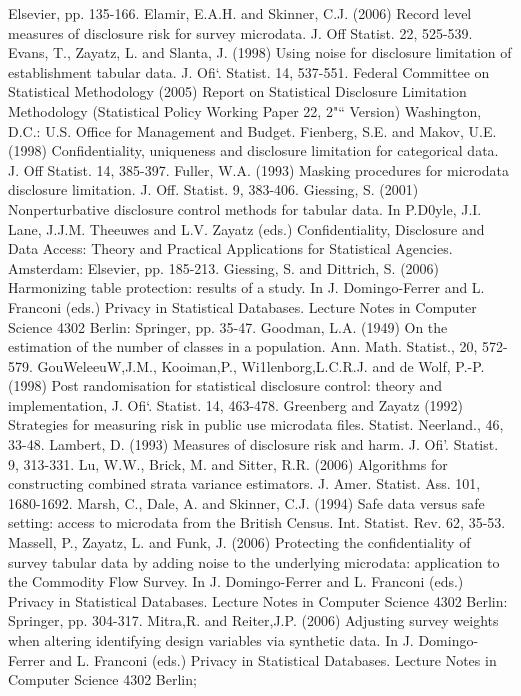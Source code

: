 Elsevier, pp. 135-166.
Elamir, E.A.H. and Skinner, C.J. (2006) Record level measures of disclosure risk for
survey microdata. J. Off Statist. 22, 525-539.
Evans, T., Zayatz, L. and Slanta, J. (1998) Using noise for disclosure limitation of
establishment tabular data. J. Oﬁ‘. Statist. 14, 537-551.
Federal Committee on Statistical Methodology (2005) Report on Statistical Disclosure
Limitation Methodology (Statistical Policy Working Paper 22, 2"“ Version)
Washington, D.C.: U.S. Office for Management and Budget.
Fienberg, S.E. and Makov, U.E. (1998) Confidentiality, uniqueness and disclosure
limitation for categorical data. J. Off Statist. 14, 385-397.
Fuller, W.A. (1993) Masking procedures for microdata disclosure limitation. J. Off.
Statist. 9, 383-406.
Giessing, S. (2001) Nonperturbative disclosure control methods for tabular data. In
P.D0yle, J.I. Lane, J.J.M. Theeuwes and L.V. Zayatz (eds.) Conﬁdentiality,
Disclosure and Data Access: Theory and Practical Applications for Statistical
Agencies. Amsterdam: Elsevier, pp. 185-213.
Giessing, S. and Dittrich, S. (2006) Harmonizing table protection: results of a study. In J.
Domingo-Ferrer and L. Franconi (eds.) Privacy in Statistical Databases. Lecture
Notes in Computer Science 4302 Berlin: Springer, pp. 35-47.
Goodman, L.A. (1949) On the estimation of the number of classes in a population. Ann.
Math. Statist., 20, 572-579.
GouWeleeuW,J.M., Kooiman,P., Wi1lenborg,L.C.R.J. and de Wolf, P.-P. (1998) Post
randomisation for statistical disclosure control: theory and implementation, J. Oﬁ‘.
Statist. 14, 463-478.
Greenberg and Zayatz (1992) Strategies for measuring risk in public use microdata files.
Statist. Neerland., 46, 33-48.
Lambert, D. (1993) Measures of disclosure risk and harm. J. Oﬁ’. Statist. 9, 313-331.
Lu, W.W., Brick, M. and Sitter, R.R. (2006) Algorithms for constructing combined strata
variance estimators. J. Amer. Statist. Ass. 101, 1680-1692.
Marsh, C., Dale, A. and Skinner, C.J. (1994) Safe data versus safe setting: access to
microdata from the British Census. Int. Statist. Rev. 62, 35-53.
Massell, P., Zayatz, L. and Funk, J. (2006) Protecting the confidentiality of survey tabular
data by adding noise to the underlying microdata: application to the Commodity Flow
Survey. In J. Domingo-Ferrer and L. Franconi (eds.) Privacy in Statistical Databases.
Lecture Notes in Computer Science 4302 Berlin: Springer, pp. 304-317.
Mitra,R. and Reiter,J.P. (2006) Adjusting survey weights when altering identifying
design variables via synthetic data. In J. Domingo-Ferrer and L. Franconi (eds.)
Privacy in Statistical Databases. Lecture Notes in Computer Science 4302 Berlin;

